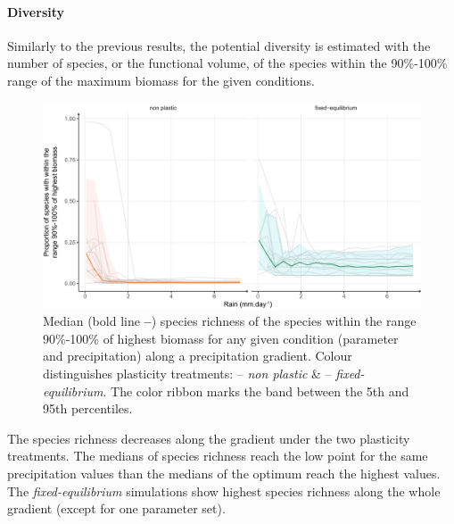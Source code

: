 
\paragraph{Diversity}

Similarly to the previous results, the potential diversity is estimated with the number of species, or the functional volume, of the species within the 90\%-100\% range of the maximum biomass for the given conditions.

\begin{figure}\label{fig:species_richness_grad}
\includegraphics[width = \textwidth]{./2_PP/Figures/Rain/gradient_plot_spdiv10.pdf}
\caption[Species richness of the best performing species along a precipitation gradient]{Median (bold line \textbf{--}) species richness of the species within the range 90\%-100\% of highest biomass for any given condition (parameter and precipitation) along a precipitation gradient.  Colour distinguishes plasticity treatments: \textcolor{myOrange}{-- \textit{non plastic}} \&  \textcolor{myGreen}{-- \textit{fixed-equilibrium}}. The color ribbon marks the band between the 5th and 95th percentiles.} \end{figure}

The species richness decreases along the gradient under the two plasticity treatments. The medians of species richness reach the low point for the same precipitation values than the medians of the optimum reach the highest values. The \textit{fixed-equilibrium} simulations show highest species richness along the whole gradient (except for one parameter set).

